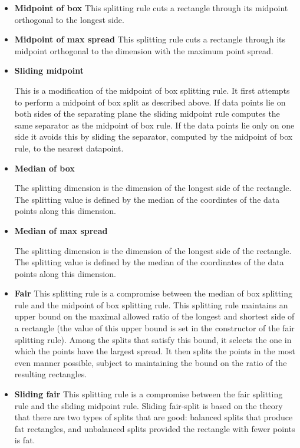 \begin{itemize}

\item {\bf Midpoint of box}
This splitting rule cuts a rectangle through its midpoint orthogonal
to the longest side.

\item {\bf Midpoint of max spread}
This splitting rule cuts a rectangle through its midpoint orthogonal
to the dimension with the maximum point spread.

\item {\bf Sliding midpoint}

This is a modification of the midpoint of box splitting rule.
It first attempts to perform a midpoint of box split as
described above. If data points lie on both sides of the separating
plane the sliding midpoint rule computes the same separator as
the midpoint of box rule. If the data points lie only on one
side it avoids this by sliding the separator, computed by
the midpoint of box rule, to the nearest datapoint.

\item {\bf Median of box}

The splitting dimension is the dimension of the longest side of the rectangle.
The splitting value is defined by the median of the coordintes of the data points
along this dimension.

\item {\bf Median of max spread}

The splitting dimension is the dimension of the longest side of the rectangle.
The splitting value is defined by the median of the coordinates of the data points
along this dimension.

\item {\bf Fair}
This splitting rule is a compromise between the median of box splitting rule
and the midpoint of box splitting rule. This splitting rule maintains an upper
bound on the maximal allowed ratio of the longest and shortest side of
a rectangle (the value of this upper bound is set in the constructor of the
fair splitting rule). Among the splits that satisfy this bound, it selects
the one in which the points have the largest spread.
It then splits the points in the most even manner possible, subject
to maintaining the bound on the ratio of the resulting rectangles.

\item {\bf Sliding fair}
This splitting rule is a compromise between the fair splitting rule
and the sliding midpoint rule.
Sliding fair-split is based on the theory that there are
two types of splits that are good: balanced splits that
produce fat rectangles, and unbalanced splits provided
the rectangle with fewer points is fat.


\end{itemize}
